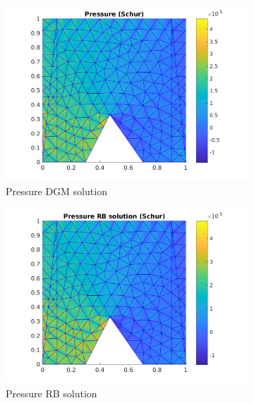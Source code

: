 \documentclass[graybox]{svmult}
\begin{document}
\begin{figure}[H]
\begin{subfigure}{0.31\textwidth}
\includegraphics[width=\linewidth]{offline_pressure_at_47_33.jpg}
\caption{Pressure DGM solution} \label{pre_dg}
\end{subfigure}\hspace*{\fill}
\begin{subfigure}{0.31\textwidth}
\includegraphics[width=\linewidth]{online_pressure_at_47_33.jpg}
\caption{Pressure RB solution} \label{pre_rb}
\end{subfigure}
\begin{subfigure}{0.31\textwidth}

\end{subfigure}
\end{figure}
\end{document}
